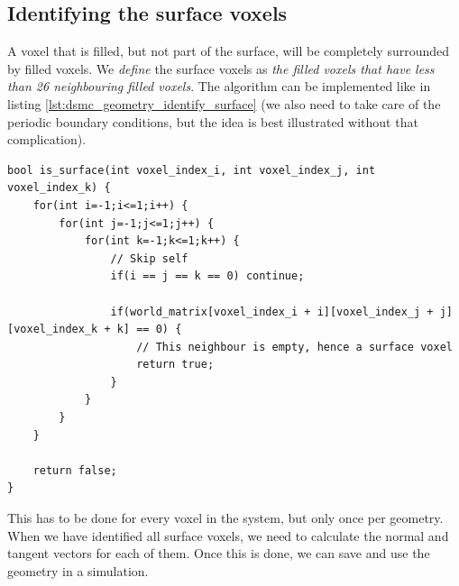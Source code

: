 \subsection{Identifying the surface voxels}
A voxel that is filled, but not part of the surface, will be completely surrounded by filled voxels. We \textit{define} the surface voxels as \textit{the filled voxels that have less than 26 neighbouring filled voxels}. The algorithm can be implemented like in listing \ref{lst:dsmc_geometry_identify_surface} (we also need to take care of the periodic boundary conditions, but the idea is best illustrated without that complication).
\begin{lstlisting}[caption=An example showing how to identify the surface voxels. The world\_matrix contains all the voxel values (zeros and ones)., label=lst:dsmc_geometry_identify_surface]
bool is_surface(int voxel_index_i, int voxel_index_j, int voxel_index_k) {
	for(int i=-1;i<=1;i++) {
    	for(int j=-1;j<=1;j++) {
			for(int k=-1;k<=1;k++) {
				// Skip self
				if(i == j == k == 0) continue; 

                if(world_matrix[voxel_index_i + i][voxel_index_j + j][voxel_index_k + k] == 0) {
                	// This neighbour is empty, hence a surface voxel
                	return true;
                }
            }
        }
    }

    return false;
}
\end{lstlisting}
This has to be done for every voxel in the system, but only once per geometry. When we have identified all surface voxels, we need to calculate the normal and tangent vectors for each of them. Once this is done, we can save and use the geometry in a simulation.
